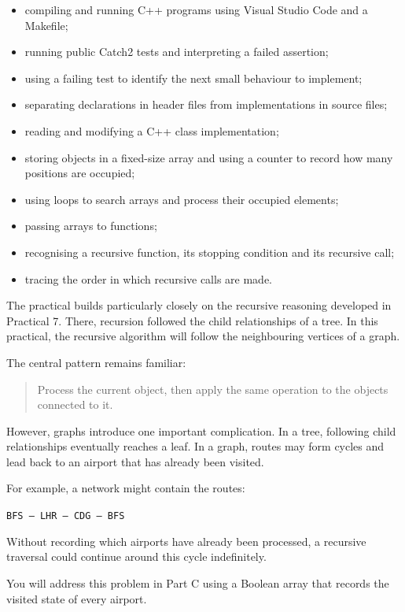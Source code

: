\documentclass{csc2059practical}
\begin{document}
\begin{itemize}
\item compiling and running C++ programs using Visual Studio Code and a
Makefile;
\item running public Catch2 tests and interpreting a failed assertion;
\item using a failing test to identify the next small behaviour to
implement;
\item separating declarations in header files from implementations in
source files;
\item reading and modifying a C++ class implementation;
\item storing objects in a fixed-size array and using a counter to record
how many positions are occupied;
\item using loops to search arrays and process their occupied elements;
\item passing arrays to functions;
\item recognising a recursive function, its stopping condition and its
recursive call;
\item tracing the order in which recursive calls are made.
\end{itemize}

The practical builds particularly closely on the recursive reasoning developed
in Practical 7. There, recursion followed the child relationships of a tree. In
this practical, the recursive algorithm will follow the neighbouring vertices
of a graph.

The central pattern remains familiar:

\begin{quote}
Process the current object, then apply the same operation to the objects
connected to it.
\end{quote}

However, graphs introduce one important complication. In a tree, following child
relationships eventually reaches a leaf. In a graph, routes may form cycles and
lead back to an airport that has already been visited.

For example, a network might contain the routes:

\begin{center}
\texttt{BFS – LHR – CDG – BFS}
\end{center}

Without recording which airports have already been processed, a recursive
traversal could continue around this cycle indefinitely.

You will address this problem in Part C using a Boolean array that records the
visited state of every airport.
\end{document}
